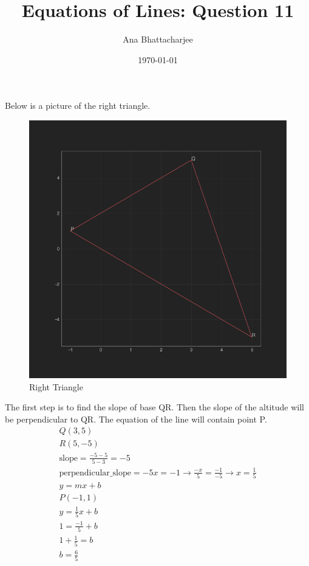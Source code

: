 \documentclass{article}
\begin{document}
\title{Equations of Lines: Question 11}
\author{Ana Bhattacharjee}
\date{\today}
\maketitle
\begin{center}
Below is a picture of the right triangle.
\begin{figure}[!htbp]
  \includegraphics[width=1.1\columnwidth]{../line_eq_q11}
  \caption{Right Triangle}
\end{figure}
The first step is to find the slope of base QR. Then the slope of the altitude will be perpendicular to QR. The equation of the line will contain point P.
\begin{align}
Q (3,5) \\
R (5, -5) \\
\text{slope} = \frac{-5 - 5}{5 - 3} = -5 \\
\text{perpendicular\_slope} = -5x = -1 \rightarrow \frac{-x}{5} = \frac{-1}{-5} \rightarrow x = \frac{1}{5} \\
y = mx + b \\
P (-1, 1) \\
y = \frac{1}{5}x + b \\
1 = \frac{-1}{5} + b \\
1 + \frac{1}{5} = b \\
b = \frac{6}{5}
\end{align}
\end{center}
\end{document}
